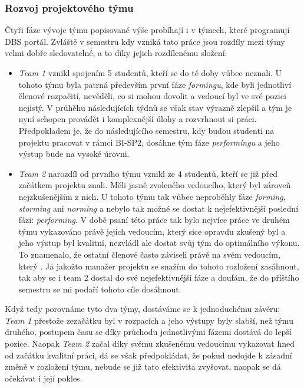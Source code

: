\subsubsection{Rozvoj projektového týmu}
Čtyři fáze vývoje týmu popisované výše probíhají i v týmech, které programují DBS portál. Zvláště v semestru kdy vzniká tato práce jsou rozdíly mezi týmy velmi dobře sledovatelné, a to díky jejich rozdílenému složení:
\begin{itemize}
	\item \emph{Team 1} vznikl spojením 5 studentů, kteří se do té doby vůbec neznali. U tohoto týmu byla patrná především první fáze \emph{formingu}, kde byli jednotliví členové rozpačití, nevěděli, co si mohou dovolit a vedoucí byl ve své pozici nejistý. V průhěhu následujících týdnů se však stav výrazně zlepšil a tým je nyní schopen provádět i komplexnější úlohy a rozvrhnout si práci. Předpokladem je, že do následujícího semestru, kdy budou studenti na projektu pracovat v rámci BI-SP2, dosáhne tým fáze \emph{performingu} a jeho výstup bude na vysoké úrovni.
	\item \emph{Team 2} narozdíl od prvního týmu vznikl ze 4 studentů, kteří se již před začátkem projektu znali. Měli jasně zvoleného vedoucího, který byl zároveň nejzkušenějším z nich. U tohoto týmu tak vůbec neproběhly fáze \emph{forming}, \emph{storming} ani \emph{norming} a nebylo tak možné se dostat k nejefektivnější poslední fázi: \emph{performing}. V době psaní této práce tak bylo nejvíce práce ve druhém týmu vykazováno právě jejich vedoucím, který sice opravdu zkušený byl a jeho výstup byl kvalitní, nezvládl ale dostat svůj tým do optimálního výkonu. To znamenalo, že ostatní členové často záviseli právě na svém vedoucím, který . Já jakožto manažer projektu se snažím do tohoto rozložení zasáhnout, tak aby se i team 2 dostal do své nejefektivnější fáze a doufám, že do příštího semestru se mi podaří tohoto cíle dosáhnout.
\end{itemize}
Když tedy porovnáme tyto dva týmy, dostáváme se k jednoduchému závěru: \emph{Team 1} přestože zezačátku byl v rozpacích a jeho výstupy byly slabší, než týmu druhého, postupem času se díky průchodu jednotlivými fázemi dostává do lepší pozice. Naopak \emph{Team 2} začal díky svému zkušenému vedoucímu vykazovat hned od začátku kvalitní práci, dá se však předpokládat, že pokud nedojde k zásadní změně v rozložení týmu, nebude se již tato efektivita zvyšovat, naopak se dá očekávat i její pokles.

